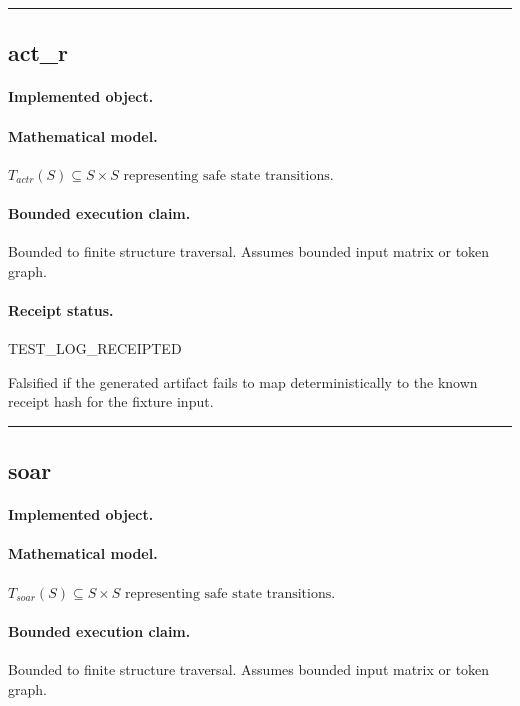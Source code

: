 \vspace{1em}\hrule\vspace{1em}
\subsection{act\_r}
\paragraph{Implemented object.} 
\paragraph{Mathematical model.} $T_{actr}(S) \subseteq S \times S \text{ representing safe state transitions}.$
\paragraph{Bounded execution claim.} Bounded to finite structure traversal. Assumes bounded input matrix or token graph.
\paragraph{Receipt status.} TEST\_LOG\_RECEIPTED
\begin{falsifier}
Falsified if the generated artifact fails to map deterministically to the known receipt hash for the fixture input.
\end{falsifier}

\vspace{1em}\hrule\vspace{1em}
\subsection{soar}
\paragraph{Implemented object.} 
\paragraph{Mathematical model.} $T_{soar}(S) \subseteq S \times S \text{ representing safe state transitions}.$
\paragraph{Bounded execution claim.} Bounded to finite structure traversal. Assumes bounded input matrix or token graph.
